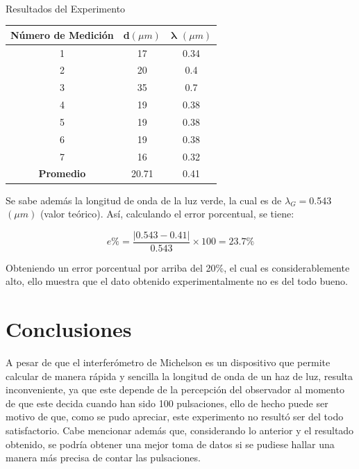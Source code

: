 \documentclass[13,twocolumn,letterpaper]{article}
\begin{document}
\begin{table}[h]
    \centering
    \hline \hline\\
    Resultados del Experimento
    \hline \hline \\
    \begin{tabular}{|| c | c | c ||}
\hline \hline 
Número de Medición & \textbf{d}$(\mu m)$ & $\mathbf{\lambda}$ $(\mu m)$ \\ \hline
        1 & 17 & 0.34 \\ 
        2 & 20 & 0.4 \\ 
        3 & 35 & 0.7 \\ 
        4 & 19 & 0.38 \\ 
        5 & 19 & 0.38 \\ 
        6 & 19 & 0.38 \\
        7 & 16 & 0.32 \\\hline 
\textbf{Promedio} & 20.71 & 0.41 \\ \hline
    \end{tabular}
    \label{tab:my_label}
\end{table}

Se sabe además la longitud de onda de la luz verde, la cual es de ${\lambda}_{G}=$0.543 $(\mu m)$ (valor teórico). Así, calculando el error porcentual, se tiene: 

\[ e\% =  \frac{|0.543 − 0.41|}{0.543}\times 100 = 23.7 \% \]

Obteniendo un error porcentual por arriba del 20\%, el cual es  considerablemente alto,  ello muestra que el dato obtenido experimentalmente no es del todo bueno.

\section*{Conclusiones}
A pesar de que el interferómetro de Michelson es un dispositivo que permite calcular de manera rápida y sencilla la longitud de onda de un haz de luz, resulta inconveniente, ya que este depende de la percepción del observador al momento de que este decida cuando han sido 100 pulsaciones, ello de hecho puede ser motivo de que, como se pudo apreciar, este experimento no resultó ser del todo satisfactorio. 
Cabe mencionar además que, considerando lo anterior y el resultado obtenido, se podría obtener una mejor toma de datos si se pudiese hallar una manera más precisa de contar las pulsaciones. 
 


\nocite{Hecht}\nocite{Rossi}\nocite{Sears}\nocite{Born}\nocite{Tipler}\nocite{Feynman}\nocite{Res}


\end{document}
